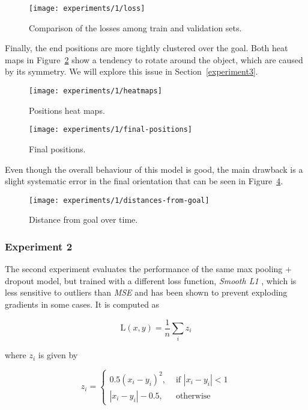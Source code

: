 \begin{figure}[htbp]
\centerline{\texttt{[image: experiments/1/loss]}}
	\caption{Comparison of the losses among train and validation sets.}
	\label{fig:loss}
\end{figure}

Finally, the end positions are more tightly clustered over the goal.
Both heat maps in Figure~\ref{fig:heatmaps} show a tendency to rotate around 
the object, which are caused by its symmetry. We will explore this issue in 
Section~\ref{experiment3}.

\begin{figure}[htbp]
	\centerline{\texttt{[image: experiments/1/heatmaps]}}
	\caption{Positions heat maps.}
	\label{fig:heatmaps}
\end{figure}

\begin{figure}[htbp]
	\centerline{\texttt{[image: experiments/1/final-positions]}}
	\caption{Final positions.}
	\label{fig:final-positions}
\end{figure}

Even though the overall behaviour of this model is good, the main drawback is a 
slight systematic error in the final orientation that can be seen in 
Figure~\ref{fig:distance-from-goal-learned}.

\begin{figure}[htbp]
	\centerline{\texttt{[image: experiments/1/distances-from-goal]}}
	\caption{Distance from goal over time.}
	\label{fig:distance-from-goal-learned}
\end{figure}

\subsubsection{Experiment 2}
The second experiment evaluates the performance of the same max pooling + 
dropout model, but trained with a different loss function, \emph{Smooth 
L1} \cite{smoothl1}, which is less sensitive to outliers than \emph{MSE} and 
has been shown to prevent exploding gradients in some cases. It is computed as

\begin{equation}
\text{L}(x, y) = \frac{1}{n}\sum_{i}z_i
\label{smoothl1}
\end{equation}

where $z_i$ is given by

\begin{equation}
z_i = 
\begin{cases}
0.5 (x_i-y_i)^2, &\text{ if } |x_i-y_i|<1 \\
|x_i-y_i| - 0.5, &\text{ otherwise}
\end{cases}
\end{equation}

